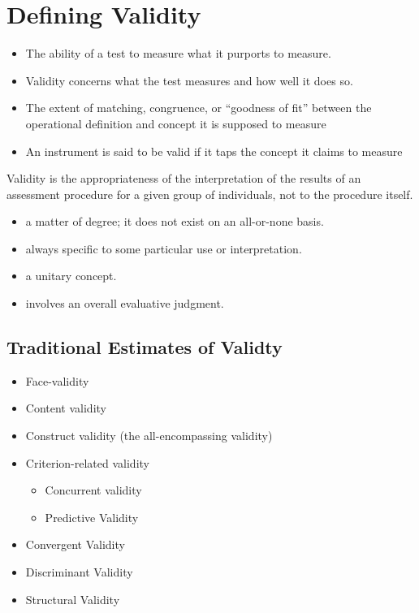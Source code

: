 \documentclass[
  english,
]{book}
\providecommand{\tightlist}{%
  \setlength{\itemsep}{0pt}\setlength{\parskip}{0pt}}
\begin{document}
\hypertarget{defining-validity}{%
\section{Defining Validity}\label{defining-validity}}

\begin{itemize}
\tightlist
\item
  The ability of a test to measure what it purports to measure.
\item
  Validity concerns what the test measures and how well it does so.
\item
  The extent of matching, congruence, or ``goodness of fit'' between the operational definition and concept it is supposed to measure
\item
  An instrument is said to be valid if it taps the concept it claims to measure
\end{itemize}

Validity is the appropriateness of the interpretation of the results of an assessment procedure for a given group of individuals, not to the procedure itself.

\begin{itemize}
\tightlist
\item
  a matter of degree; it does not exist on an all-or-none basis.
\item
  always specific to some particular use or interpretation.
\item
  a unitary concept.
\item
  involves an overall evaluative judgment.
\end{itemize}

\hypertarget{traditional-estimates-of-validty}{%
\subsection{Traditional Estimates of Validty}\label{traditional-estimates-of-validty}}

\begin{itemize}
\tightlist
\item
  Face-validity
\item
  Content validity
\item
  Construct validity (the all-encompassing validity)
\item
  Criterion-related validity

  \begin{itemize}
  \tightlist
  \item
    Concurrent validity
  \item
    Predictive Validity
  \end{itemize}
\item
  Convergent Validity
\item
  Discriminant Validity
\item
  Structural Validity
\end{itemize}
\end{document}
